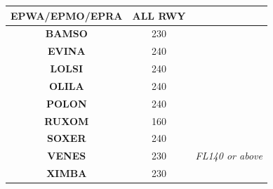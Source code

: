 
\centering
{}
\begin{tabular}{|c|c|c|}
	\hline
	\rowcolor{white}
	\color{white}\cellcolor{vred}\textbf{EPWA/EPMO/EPRA} & \textbf{ALL RWY} &                         \\\hline
	\textbf{BAMSO}                                       & 230              &                         \\\hline
	\textbf{EVINA}                                       & 240              &                         \\\hline
	\textbf{LOLSI}                                       & 240              &                         \\\hline
	\textbf{OLILA}                                       & 240              &                         \\\hline
	\textbf{POLON}                                       & 240              &                         \\\hline
	\textbf{RUXOM}                                       & 160              &                         \\\hline
	\textbf{SOXER}                                       & 240              &                         \\\hline
	\textbf{VENES}                                       & 230              & \textit{FL140 or above} \\\hline
	\textbf{XIMBA}                                       & 230              &                         \\\hline
\end{tabular}

